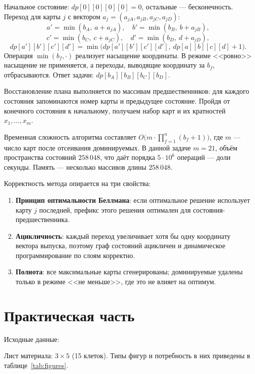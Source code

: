 Начальное состояние: $dp[0][0][0][0] = 0$, остальные — бесконечность.
Переход для карты $j$ с вектором $a_j = (a_{jA}, a_{jB}, a_{jC}, a_{jD})$:
\[
a' = \min(b_A,\ a + a_{jA}), \quad b' = \min(b_B,\ b + a_{jB}),
\]
\[
c' = \min(b_C,\ c + a_{jC}), \quad d' = \min(b_D,\ d + a_{jD}),
\]
\[
dp[a'][b'][c'][d'] = \min\bigl(dp[a'][b'][c'][d'],\ dp[a][b][c][d] + 1\bigr).
\]
Операция $\min(b_f, \cdot)$ реализует насыщение координаты. В режиме
<<ровно>> насыщение не применяется, а переходы, выводящие координату
за $b_f$, отбрасываются. Ответ задачи: $dp[b_A][b_B][b_C][b_D]$.

Восстановление плана выполняется по массивам предшественников: для
каждого состояния запоминаются номер карты и предыдущее состояние.
Пройдя от конечного состояния к начальному, получаем набор карт и их
кратностей $x_1, \ldots, x_m$.


Временная сложность алгоритма составляет
$O\bigl(m \cdot \prod_{f=1}^{n}(b_f+1)\bigr)$, где $m$ — число карт
после отсеивания доминируемых. В данной задаче $m = 21$, объём
пространства состояний $258\,048$, что даёт порядка $5 \cdot 10^6$
операций — доли секунды. Память — несколько массивов длины $258\,048$.

Корректность метода опирается на три свойства:
\begin{enumerate}
    \item \textbf{Принцип оптимальности Беллмана}: если оптимальное
          решение использует карту $j$ последней, префикс этого
          решения оптимален для состояния-предшественника.
    \item \textbf{Ацикличность}: каждый переход увеличивает хотя бы
          одну координату вектора выпуска, поэтому граф состояний
          ацикличен и динамическое программирование по слоям
          корректно.
    \item \textbf{Полнота}: все максимальные карты сгенерированы;
          доминируемые удалены только в режиме <<не меньше>>, где это
          не влияет на оптимум.
\end{enumerate}





\clearpage

\section{Практическая часть}

Исходные данные:


Лист материала: $3 \times 5$ (15 клеток). Типы фигур и потребность в них
приведены в таблице~\ref{tab:figures}.

